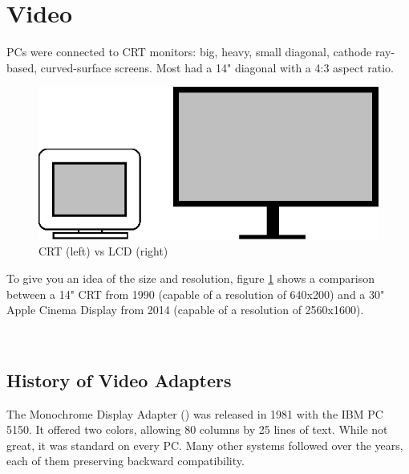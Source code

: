 \documentclass[book.tex]{subfiles}
\begin{document}
\section{Video}

PCs were connected to CRT monitors: big, heavy, small diagonal, cathode ray-based, curved-surface screens. Most had a 14" diagonal with a 4:3 aspect ratio.\\
\par


\begin{figure}[H]
\centering
\includegraphics[width=\textwidth]{imgs/drawings/crt_lcd.eps}
\caption{CRT (left) vs LCD (right)}
\label{fig:lcd_vs_crt}
\end{figure}
\par
  To give you an idea of the size and resolution, figure \ref{fig:lcd_vs_crt} shows a comparison between a 14" CRT from 1990 (capable of a resolution of 640x200) and a 30" Apple Cinema Display from 2014 (capable of a resolution of 2560x1600).\\
  \par
{}
\\

  \subsection{History of Video Adapters}

The Monochrome Display Adapter () was released in 1981 with the IBM PC 5150. It offered two colors, allowing 80 columns by 25 lines of text.  While not great, it was standard on every PC. Many other systems followed over the years, each of them preserving backward compatibility.

\bigskip
  
\end{document}
